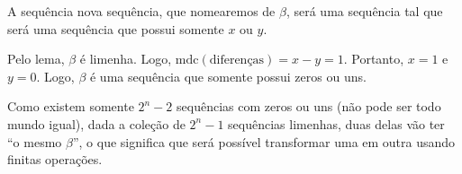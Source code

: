 \documentclass[11pt,a4paper]{article}
\begin{document}
\begin{sol}
		A sequência	nova sequência, que nomearemos de $\beta$, será uma sequência tal que será uma sequência que possui somente $x$ ou $y$.

		Pelo lema, $\beta$ é limenha. Logo, $\text{mdc}(\text{diferenças}) = x - y = 1$. Portanto, $x = 1$ e  $y =0$. Logo,  $\beta$ é uma sequência que somente possui zeros ou uns.
		
		Como existem somente $2^n - 2$ sequências com zeros ou uns (não pode ser todo mundo igual), dada a coleção de $2^n - 1$ sequências limenhas, duas delas vão ter ``o mesmo $\beta$'', o que significa que será possível transformar uma em outra usando finitas operações.
	\end{sol}
\end{document}

